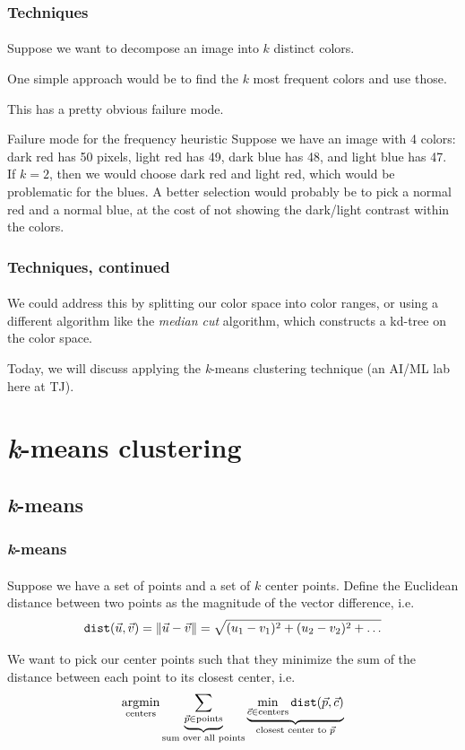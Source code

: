 \documentclass{beamer}                             %
\DeclareMathOperator*{\argmin}{argmin}
\begin{document}
\begin{frame}
\frametitle{Techniques}
\framesubtitle{}
Suppose we want to decompose an image into \( k \) distinct colors. \pause

One simple approach would be to find the \( k \)
most frequent colors and use those. \pause

This has a pretty obvious failure mode. \pause

\begin{exampleblock}{Failure mode for the frequency heuristic}
  Suppose we have an image with 4 colors: dark red has 50 pixels, light red
  has 49, dark blue has 48, and light blue has 47. If \( k = 2 \), then we 
  would choose dark red and light red, which would be problematic for the blues.
  A better selection would probably be to pick a normal red and a normal blue,
  at the cost of not showing the dark/light contrast within the colors.
\end{exampleblock}
\end{frame}

\begin{frame}
\frametitle{Techniques, continued}
\framesubtitle{}
We could address this by splitting our color space into color ranges, or using
a different algorithm like the \textit{median cut} algorithm, which constructs
a kd-tree on the color space. \pause

Today, we will discuss applying the  \textit{k}-means clustering technique
(an AI/ML lab here at TJ).
\end{frame}

\section{\textit{k}-means clustering}
\subsection{\textit{k}-means}
\begin{frame}
\frametitle{\textit{k}-means}
\framesubtitle{}
Suppose we have a set of points and a set of \( k \) \alert{center} points.
Define the \alert{Euclidean distance} between two points
as the magnitude of the vector difference, i.e.
\[ \texttt{dist}(\vec{u}, \vec{v}) = \norm{\vec{u} - \vec{v}}
= \sqrt{(u_1 - v_1)^2 + (u_2 - v_2)^2 + \dots} \] \pause 

We want to pick our center points such that they minimize the sum of the
distance between each point to its closest center, i.e.
\[ \argmin_{\text{centers}}
  \underbrace{\sum_{\vec{p} \in \text{points}}}_{\text{sum over all points}}
  \underbrace{\min_{\vec{c} \in \text{centers}} \texttt{dist}(\vec{p}, \vec{c})}_
{\text{closest center to \( \vec{p} \)}} \]
\end{frame}
\end{document}
